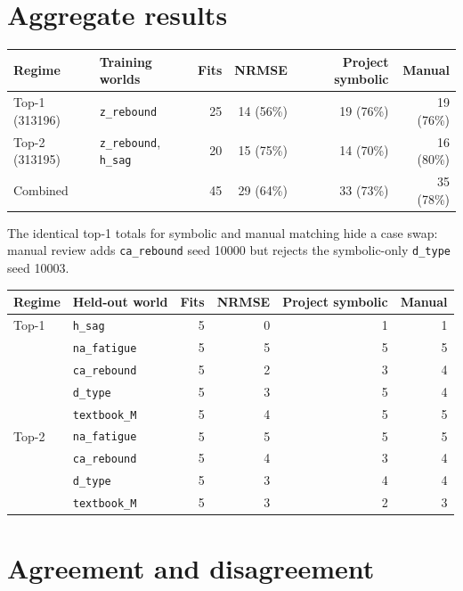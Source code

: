 \documentclass[10pt]{article}
\begin{document}
\section*{Aggregate results}

\begin{center}
\begin{tabular}{llrrrr}
\toprule
Regime & Training worlds & Fits & NRMSE & Project symbolic & Manual\\
\midrule
Top-1 (313196) & \texttt{z\_rebound} & 25 & 14 (56\%) & 19 (76\%) & 19 (76\%)\\
Top-2 (313195) & \texttt{z\_rebound}, \texttt{h\_sag} & 20 & 15 (75\%) & 14 (70\%) & 16 (80\%)\\
\midrule
Combined & & 45 & 29 (64\%) & 33 (73\%) & 35 (78\%)\\
\bottomrule
\end{tabular}
\end{center}

The identical top-1 totals for symbolic and manual matching hide a case swap:
manual review adds \texttt{ca\_rebound} seed 10000 but rejects the symbolic-only
\texttt{d\_type} seed 10003.

\begin{center}
\small
\begin{tabular}{llrrrr}
\toprule
Regime & Held-out world & Fits & NRMSE & Project symbolic & Manual\\
\midrule
Top-1 & \texttt{h\_sag} & 5 & 0 & 1 & 1\\
 & \texttt{na\_fatigue} & 5 & 5 & 5 & 5\\
 & \texttt{ca\_rebound} & 5 & 2 & 3 & 4\\
 & \texttt{d\_type} & 5 & 3 & 5 & 4\\
 & \texttt{textbook\_M} & 5 & 4 & 5 & 5\\
\midrule
Top-2 & \texttt{na\_fatigue} & 5 & 5 & 5 & 5\\
 & \texttt{ca\_rebound} & 5 & 4 & 3 & 4\\
 & \texttt{d\_type} & 5 & 3 & 4 & 4\\
 & \texttt{textbook\_M} & 5 & 3 & 2 & 3\\
\bottomrule
\end{tabular}
\end{center}

\section*{Agreement and disagreement}
\end{document}
